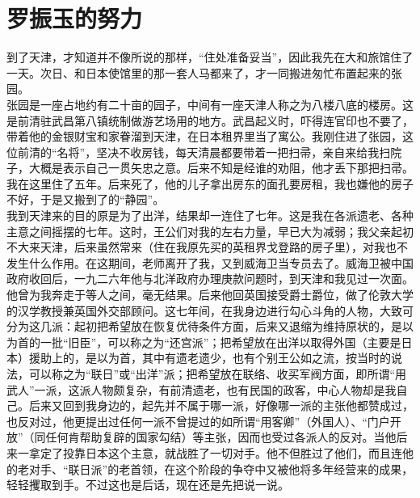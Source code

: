 \fancyhead[RO]{} %
\fancyhead[LE]{} %
\chapter*{罗振玉的努力}
\thispagestyle{empty}
到了天津，才知道并不像所说的那样，“住处准备妥当”，因此我先在大和旅馆住了一天。次日、和日本使馆里的那一套人马都来了，才一同搬进匆忙布置起来的张园。\\

张园是一座占地约有二十亩的园子，中间有一座天津人称之为八楼八底的楼房。这是前清驻武昌第八镇统制做游艺场用的地方。武昌起义时，吓得连官印也不要了，带着他的金银财宝和家眷溜到天津，在日本租界里当了寓公。我刚住进了张园，这位前清的“名将”，坚决不收房钱，每天清晨都要带着一把扫帚，亲自来给我扫院子，大概是表示自己一贯矢忠之意。后来不知是经谁的劝阻，他才丢下那把扫帚。我在这里住了五年。后来死了，他的儿子拿出房东的面孔要房租，我也嫌他的房子不好，于是又搬到了的“静园”。\\

我到天津来的目的原是为了出洋，结果却一连住了七年。这是我在各派遗老、各种主意之间摇摆的七年。这时，王公们对我的左右力量，早已大为减弱；我父亲起初不大来天津，后来虽然常来（住在我原先买的英租界戈登路的房子里），对我也不发生什么作用。在这期间，老师离开了我，又到威海卫当专员去了。威海卫被中国政府收回后，一九二六年他与北洋政府办理庚款问题时，到天津和我见过一次面。他曾为我奔走于等人之间，毫无结果。后来他回英国接受爵士爵位，做了伦敦大学的汉学教授兼英国外交部顾问。这七年间，在我身边进行勾心斗角的人物，大致可分为这几派：起初把希望放在恢复优待条件方面，后来又退缩为维持原状的，是以为首的一批“旧臣”，可以称之为“还宫派”；把希望放在出洋以取得外国（主要是日本）援助上的，是以为首，其中有遗老遗少，也有个别王公如之流，按当时的说法，可以称之为“联日”或“出洋”派；把希望放在联络、收买军阀方面，即所谓“用武人”一派，这派人物颇复杂，有前清遗老，也有民国的政客，中心人物却是我自己。后来又回到我身边的，起先并不属于哪一派，好像哪一派的主张他都赞成过，也反对过，他更提出过任何一派不曾提过的如所谓“用客卿”（外国人）、“门户开放”（同任何肯帮助复辟的国家勾结）等主张，因而也受过各派人的反对。当他后来一拿定了投靠日本这个主意，就战胜了一切对手。他不但胜过了他们，而且连他的老对手、“联日派”的老首领，在这个阶段的争夺中又被他将多年经营来的成果，轻轻攫取到手。不过这也是后话，现在还是先把说一说。\\

